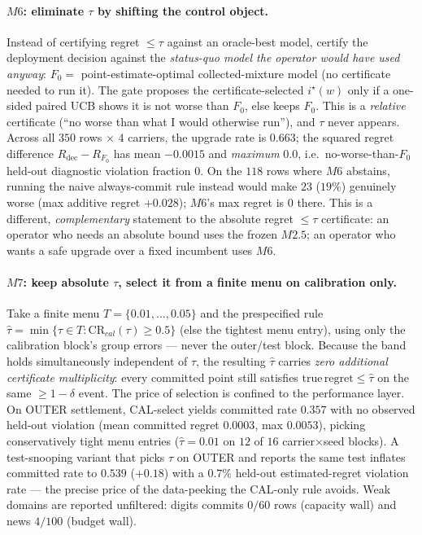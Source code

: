 \documentclass{article}
\begin{document}
\paragraph{$M6$: eliminate $\tau$ by shifting the control object.}
Instead of certifying regret $\le\tau$ against an oracle-best model, certify the
deployment decision against the \emph{status-quo model the operator would have used anyway}:
$F_0 = $ point-estimate-optimal collected-mixture model (no certificate needed to run it).
The gate proposes the certificate-selected $i^\star(w)$ only if a one-sided paired UCB
shows it is not worse than $F_0$, else keeps $F_0$. This is a \emph{relative} certificate
(``no worse than what I would otherwise run''), and $\tau$ never appears. Across all
$350$ rows $\times$ $4$ carriers, the upgrade rate is $0.663$; the squared regret
difference $R_{\mathrm{dec}}-R_{F_0}$ has mean $-0.0015$ and \emph{maximum} $0.0$, i.e.\
no-worse-than-$F_0$ held-out diagnostic violation fraction $0$. On the $118$ rows where $M6$ abstains, running the
naive always-commit rule instead would make $23$ ($19\%$) genuinely worse
(max additive regret $+0.028$); $M6$'s max regret is $0$ there. This is a different,
\emph{complementary} statement to the absolute regret $\le\tau$ certificate: an operator
who needs an absolute bound uses the frozen $M2.5$; an operator who wants a safe upgrade
over a fixed incumbent uses $M6$.

\paragraph{$M7$: keep absolute $\tau$, select it from a finite menu on calibration only.}
Take a finite menu $T=\{0.01,\dots,0.05\}$ and the prespecified rule
$\hat\tau=\min\{\tau\in T:\mathrm{CR}_{cal}(\tau)\ge0.5\}$ (else the tightest menu entry),
using only the calibration block's group errors --- never the outer/test block. Because the
band holds simultaneously independent of $\tau$, the resulting $\hat\tau$ carries \emph{zero
additional certificate multiplicity}: every committed point still satisfies
$\mathrm{true\,regret}\le\hat\tau$ on the same $\ge1-\delta$ event. The price of selection
is confined to the performance layer. On OUTER settlement, CAL-select yields committed rate
$0.357$ with no observed held-out violation (mean committed regret $0.0003$, max $0.0053$), picking
conservatively tight menu entries ($\hat\tau{=}0.01$ on $12$ of $16$ carrier$\times$seed
blocks). A test-snooping variant that picks $\tau$ on OUTER and reports the same test
inflates committed rate to $0.539$ ($+0.18$) with a $0.7\%$ held-out estimated-regret
violation rate --- the
precise price of the data-peeking the CAL-only rule avoids. Weak domains are reported
unfiltered: digits commits $0/60$ rows (capacity wall) and news $4/100$ (budget wall).
\end{document}
